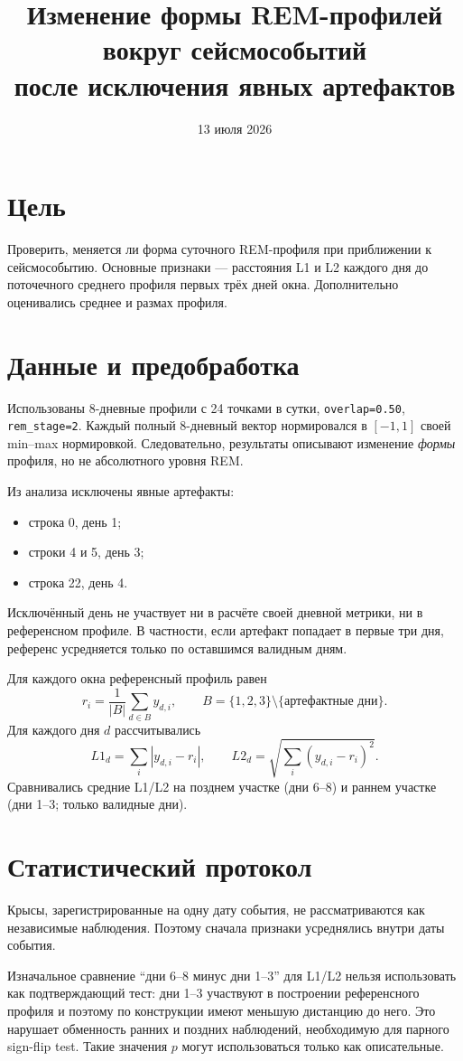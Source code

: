 \documentclass[11pt,a4paper]{article}
\title{Изменение формы REM-профилей вокруг сейсмособытий\\
после исключения явных артефактов}
\author{}
\date{13 июля 2026}
\begin{document}
\maketitle

\section{Цель}
Проверить, меняется ли форма суточного REM-профиля при приближении к
сейсмособытию. Основные признаки --- расстояния L1 и L2 каждого дня до
поточечного среднего профиля первых трёх дней окна. Дополнительно оценивались
среднее и размах профиля.

\section{Данные и предобработка}
Использованы 8-дневные профили с 24 точками в сутки, \texttt{overlap=0.50},
\texttt{rem\_stage=2}. Каждый полный 8-дневный вектор нормировался в
$[-1,1]$ своей min--max нормировкой. Следовательно, результаты описывают
изменение \emph{формы} профиля, но не абсолютного уровня REM.

Из анализа исключены явные артефакты:
\begin{itemize}
  \item строка 0, день 1;
  \item строки 4 и 5, день 3;
  \item строка 22, день 4.
\end{itemize}
Исключённый день не участвует ни в расчёте своей дневной метрики, ни в
референсном профиле. В частности, если артефакт попадает в первые три дня,
референс усредняется только по оставшимся валидным дням.

Для каждого окна референсный профиль равен
\[
  r_i = \frac{1}{|B|}\sum_{d\in B} y_{d,i}, \qquad
  B=\{1,2,3\}\setminus\{\text{артефактные дни}\}.
\]
Для каждого дня $d$ рассчитывались
\[
  L1_d=\sum_i |y_{d,i}-r_i|,
  \qquad
  L2_d=\sqrt{\sum_i(y_{d,i}-r_i)^2}.
\]
Сравнивались средние L1/L2 на позднем участке (дни 6--8) и раннем участке
(дни 1--3; только валидные дни).

\section{Статистический протокол}
Крысы, зарегистрированные на одну дату события, не рассматриваются как
независимые наблюдения. Поэтому сначала признаки усреднялись внутри даты
события.

Изначальное сравнение ``дни 6--8 минус дни 1--3'' для L1/L2 нельзя
использовать как подтверждающий тест: дни 1--3 участвуют в построении
референсного профиля и поэтому по конструкции имеют меньшую дистанцию до
него. Это нарушает обменность ранних и поздних наблюдений, необходимую для
парного sign-flip test. Такие значения $p$ могут использоваться только как
описательные.
\end{document}
